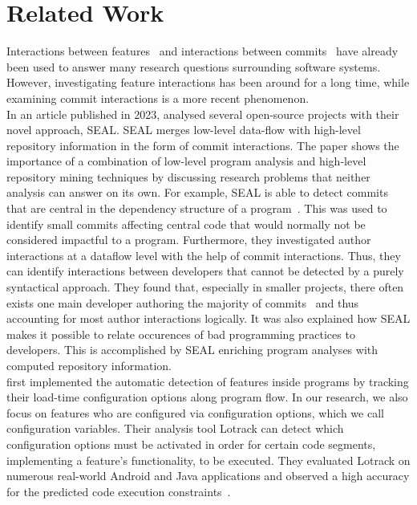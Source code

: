 \chapter{Related Work}\label{ch:related_work}

Interactions between features~\cite{lillack2014tracking,kolesnikov2017relation} and interactions between commits~\cite{sattler2023seal} have already been used to answer many research questions surrounding software systems.
However, investigating feature interactions has been around for a long time, while examining commit interactions is a more recent phenomenon. \\
In an article published in 2023, \citet{sattler2023seal} analysed several open-source projects with their novel approach, SEAL.
SEAL merges low-level data-flow with high-level repository information in the form of commit interactions.
The paper shows the importance of a combination of low-level program analysis and high-level repository mining techniques by discussing research problems that neither analysis can answer on its own.
For example, SEAL is able to detect commits that are central in the dependency structure of a program~\cite{sattler2023seal}.
This was used to identify small commits affecting central code that would normally not be considered impactful to a program.
Furthermore, they investigated author interactions at a dataflow level with the help of commit interactions.
Thus, they can identify interactions between developers that cannot be detected by a purely syntactical approach.
They found that, especially in smaller projects, there often exists one main developer authoring the majority of commits~\cite{sattler2023seal} and thus accounting for most author interactions logically. 
It was also explained how SEAL makes it possible to relate occurences of bad programming practices to developers. 
This is accomplished by SEAL enriching program analyses with computed repository information. \\
\citet{lillack2014tracking} first implemented the automatic detection of features inside programs by tracking their load-time configuration options along program flow.
In our research, we also focus on features who are configured via configuration options, which we call configuration variables. 
Their analysis tool Lotrack can detect which configuration options must be activated in order for certain code segments, implementing a feature's functionality, to be executed.
They evaluated Lotrack on numerous real-world Android and Java applications and observed a high accuracy for the predicted code execution constraints~\cite{lillack2014tracking}. \\
